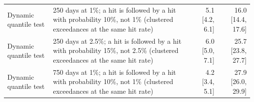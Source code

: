\begin{table}[htbp]
\begin{tabular}{p{2.9cm}p{6.6cm}rr}
\relax Dynamic quantile test & 250 days at 1\%; a hit is followed by a hit with probability 10\%, not 1\% (clustered exceedances at the same hit rate) & 5.1 [4.2, 6.1] & 16.0 [14.4, 17.6] \\
\relax Dynamic quantile test & 250 days at 2.5\%; a hit is followed by a hit with probability 15\%, not 2.5\% (clustered exceedances at the same hit rate) & 6.0 [5.0, 7.1] & 25.7 [23.8, 27.7] \\
\relax Dynamic quantile test & 750 days at 1\%; a hit is followed by a hit with probability 10\%, not 1\% (clustered exceedances at the same hit rate) & 4.2 [3.4, 5.1] & 27.9 [26.0, 29.9] \\
\bottomrule
\end{tabular}
\end{table}
